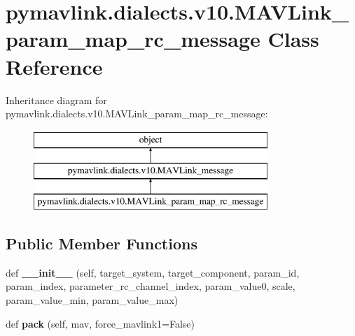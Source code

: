 \hypertarget{classpymavlink_1_1dialects_1_1v10_1_1MAVLink__param__map__rc__message}{}\section{pymavlink.\+dialects.\+v10.\+M\+A\+V\+Link\+\_\+param\+\_\+map\+\_\+rc\+\_\+message Class Reference}
\label{classpymavlink_1_1dialects_1_1v10_1_1MAVLink__param__map__rc__message}
Inheritance diagram for pymavlink.\+dialects.\+v10.\+M\+A\+V\+Link\+\_\+param\+\_\+map\+\_\+rc\+\_\+message\+:\begin{figure}[H]
\begin{center}
\leavevmode
\includegraphics[height=3.000000cm]{classpymavlink_1_1dialects_1_1v10_1_1MAVLink__param__map__rc__message}
\end{center}
\end{figure}
\subsection*{Public Member Functions}
\begin{DoxyCompactItemize}
\item 
\mbox{\label{classpymavlink_1_1dialects_1_1v10_1_1MAVLink__param__map__rc__message_a61c36a7bfe11146d04c80d7b67e7f360}} 
def {\bfseries \+\_\+\+\_\+init\+\_\+\+\_\+} (self, target\+\_\+system, target\+\_\+component, param\+\_\+id, param\+\_\+index, parameter\+\_\+rc\+\_\+channel\+\_\+index, param\+\_\+value0, scale, param\+\_\+value\+\_\+min, param\+\_\+value\+\_\+max)
\item 
\mbox{\label{classpymavlink_1_1dialects_1_1v10_1_1MAVLink__param__map__rc__message_aa7ebe49a3e34812ed5504620410d757e}} 
def {\bfseries pack} (self, mav, force\+\_\+mavlink1=False)
\end{DoxyCompactItemize}
